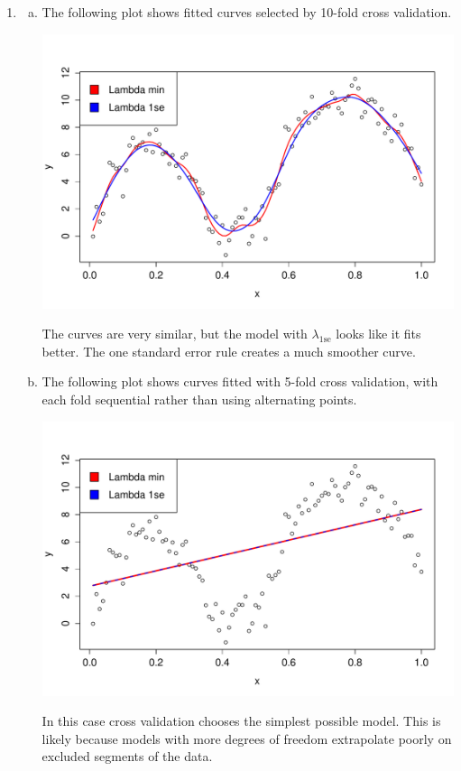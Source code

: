 \documentclass[10pt]{article}
\newcommand{\1}{\mathbbm{1}}
\begin{document}
\begin{enumerate}
\item
\begin{enumerate}[(a)]
\item The following plot shows fitted curves selected by 10-fold cross validation.
\begin{center}
\includegraphics[width=5in]{prob3_a_1.pdf}
\end{center}
The curves are very similar, but the model with $\lambda_{1\text{se}}$ looks like it fits better. The one standard error rule creates a much smoother curve.
\item The following plot shows curves fitted with 5-fold cross validation, with each fold sequential rather than using alternating points.
\begin{center}
\includegraphics[width=5in]{prob3_b_1.pdf}
\end{center}
In this case cross validation chooses the simplest possible model. This is likely because models with more degrees of freedom extrapolate poorly on excluded segments of the data.


\end{enumerate}
\end{enumerate}
\end{document}

